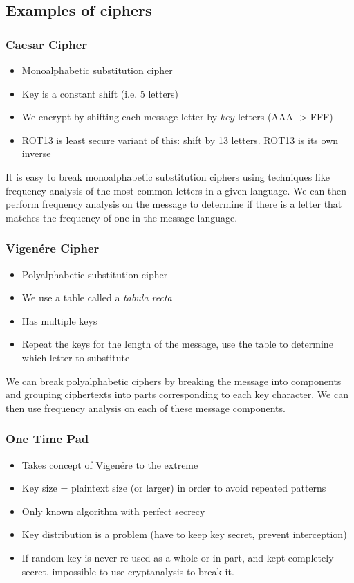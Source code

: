 \documentclass{article}
\begin{document}
\subsection{Examples of ciphers}
\subsubsection{Caesar Cipher}
\begin{itemize}
    \item Monoalphabetic substitution cipher
    \item Key is a constant shift (i.e. 5 letters)
    \item We encrypt by shifting each message letter by $key$ letters (AAA -> FFF)
    \item ROT13 is least secure variant of this: shift by 13 letters. ROT13 is its own inverse
\end{itemize}
It is easy to break monoalphabetic substitution ciphers using techniques like frequency analysis of the most common letters in a given language. We can then perform frequency analysis on the message to determine if there is a letter that matches the frequency of one in the message language.
\subsubsection{Vigenére Cipher}
\begin{itemize}
    \item Polyalphabetic substitution cipher
    \item We use a table called a \textit{tabula recta}
    \item Has multiple keys
    \item Repeat the keys for the length of the message, use the table to determine which letter to substitute
\end{itemize}
We can break polyalphabetic ciphers by breaking the message into components and grouping ciphertexts into parts corresponding to each key character. We can then use frequency analysis on each of these message components.
\subsubsection{One Time Pad}
\begin{itemize}
    \item Takes concept of Vigenére to the extreme
    \item Key size = plaintext size (or larger) in order to avoid repeated patterns
    \item Only known algorithm with perfect secrecy
    \item Key distribution is a problem (have to keep key secret, prevent interception)
    \item If random key is never re-used as a whole or in part, and kept completely secret, impossible to use cryptanalysis to break it.
\end{itemize}
\end{document}
